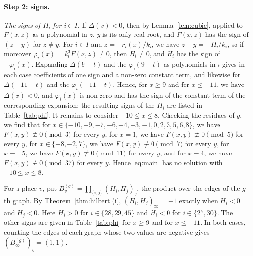 \documentclass[11pt]{article}
\begin{document}
\paragraph{Step 2: signs.} \emph{The signs of $H_i$ for $i\in I$.} If $\Delta(x)<0$, then by Lemma~\ref{lem:cubic}, applied to $F(x,z)$ as a polynomial in $z$, $y$ is its only real root, and $F(x,z)$ has the sign of $(z-y)$ for $z\neq y$. For $i\in I$ and $z=-r_i(x)/k_i$, we have $z-y=-H_i/k_i$, so if moreover $\varphi_i(x)=k_i^3F(x,z)\neq0$, then $H_i\neq0$, and $H_i$ has the sign of $-\varphi_i(x)$. Expanding $\Delta(9+t)$ and the $\varphi_i(9+t)$ as polynomials in $t$ gives in each case coefficients of one sign and a non-zero constant term, and likewise for $\Delta(-11-t)$ and the $\varphi_i(-11-t)$. Hence, for $x\geq9$ and for $x\leq-11$, we have $\Delta(x)<0$, and $\varphi_i(x)$ is non-zero and has the sign of the constant term of the corresponding expansion; the resulting signs of the $H_i$ are listed in Table~\ref{tab:phi}. It remains to consider $-10\leq x\leq8$. Checking the residues of $y$, we find that for $x\in\{-10,\allowbreak -9,\allowbreak -7,\allowbreak -6,\allowbreak -4,\allowbreak -3,\allowbreak -1,\allowbreak 0,\allowbreak 2,\allowbreak 3,\allowbreak 5,\allowbreak 6,\allowbreak 8\}$, we have $F(x,y)\not\equiv0\pmod{3}$ for every $y$, for $x=1$, we have $F(x,y)\not\equiv0\pmod{5}$ for every $y$, for $x\in\{-8,\allowbreak -2,\allowbreak 7\}$, we have $F(x,y)\not\equiv0\pmod{7}$ for every $y$, for $x=-5$, we have $F(x,y)\not\equiv0\pmod{11}$ for every $y$, and for $x=4$, we have $F(x,y)\not\equiv0\pmod{37}$ for every $y$. Hence \eqref{eq:main} has no solution with $-10\leq x\leq8$.

For a place $v$, put $B^{(g)}_v=\prod_{\{i,j\}}(H_i,H_j)_v$, the product over the edges of the $g$-th graph. By Theorem~\ref{thm:hilbert}(i), $(H_i,H_j)_\infty=-1$ exactly when $H_i<0$ and $H_j<0$. Here $H_i>0$ for $i\in\{28,\allowbreak 29,\allowbreak 45\}$ and $H_i<0$ for $i\in\{27,\allowbreak 30\}$. The other signs are given in Table~\ref{tab:phi} for $x\geq9$ and for $x\leq-11$. In both cases, counting the edges of each graph whose two values are negative gives $(B^{(g)}_\infty)_g=(1,1)$.
\end{document}
